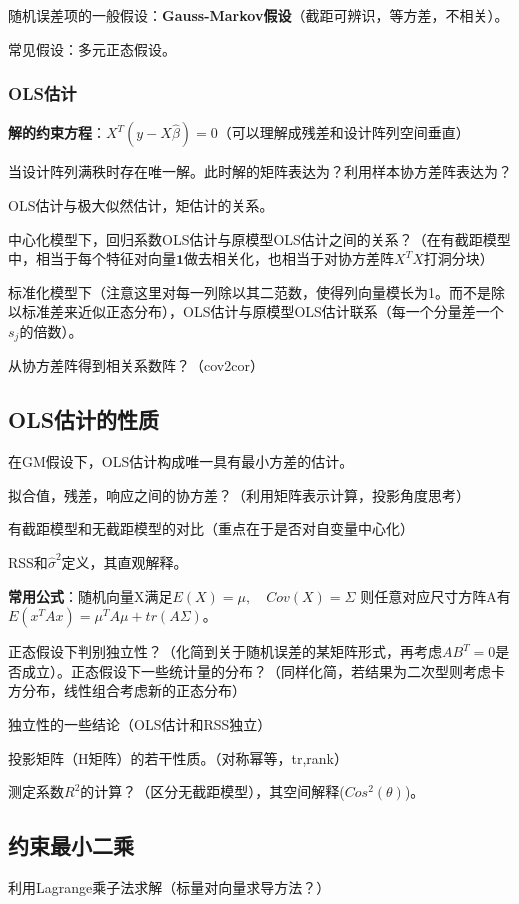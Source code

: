 \documentclass[cn,hazy,green,12pt,normal]{elegantnote}
\numberwithin{equation}{section}
\numberwithin{subsection}{section}
\begin{document}
随机误差项的一般假设：\textbf{Gauss-Markov假设}（截距可辨识，等方差，不相关）。

常见假设：多元正态假设。

\subsubsection{OLS估计}
\textbf{解的约束方程}：$X^T(y-X\hat{\beta})=0$（可以理解成残差和设计阵列空间垂直）

当设计阵列满秩时存在唯一解。此时解的矩阵表达为？利用样本协方差阵表达为？

OLS估计与极大似然估计，矩估计的关系。

中心化模型下，回归系数OLS估计与原模型OLS估计之间的关系？（在有截距模型中，相当于每个特征对向量$\bm 1$做去相关化，也相当于对协方差阵$X^TX$打洞分块）

标准化模型下（注意这里对每一列除以其二范数，使得列向量模长为1。而不是除以标准差来近似正态分布），OLS估计与原模型OLS估计联系（每一个分量差一个$s_j$的倍数）。

从协方差阵得到相关系数阵？（cov2cor）

\subsection{OLS估计的性质}
在GM假设下，OLS估计构成唯一具有最小方差的估计。

拟合值，残差，响应之间的协方差？（利用矩阵表示计算，投影角度思考）

有截距模型和无截距模型的对比（重点在于是否对自变量中心化）

RSS和$\hat{\sigma}^2$定义，其直观解释。

\textbf{常用公式}：随机向量X满足$E(X)=\mu,\quad Cov(X)=\Sigma$ 则任意对应尺寸方阵A有$E(x^TAx)=\mu^TA\mu + tr(A\Sigma)$。

正态假设下判别独立性？（化简到关于随机误差的某矩阵形式，再考虑$AB^T=0$是否成立）。正态假设下一些统计量的分布？（同样化简，若结果为二次型则考虑卡方分布，线性组合考虑新的正态分布）

独立性的一些结论（OLS估计和RSS独立）

投影矩阵（H矩阵）的若干性质。（对称幂等，tr,rank）

测定系数$R^2$的计算？（区分无截距模型），其空间解释($Cos^2(\theta)$)。

\subsection{约束最小二乘}
利用Lagrange乘子法求解（标量对向量求导方法？）
\end{document}
